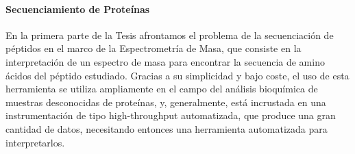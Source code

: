 %

\paragraph{Secuenciamiento de Prote\'inas}

En la primera parte de la Tesis afrontamos el problema de la secuenciación de
p\'eptidos en el marco de la Espectrometr\'ia de Masa, que consiste en la
interpretación de un espectro de masa para encontrar la secuencia de amino
ácidos del péptido estudiado.
Gracias a su simplicidad y bajo coste, el uso de esta herramienta se
utiliza ampliamente en el campo del análisis bioquímica de muestras
desconocidas de proteínas, y, generalmente, está incrustada en una
instrumentación de tipo high-throughput automatizada, que produce una gran
cantidad de datos, necesitando entonces una herramienta automatizada para
interpretarlos. 

